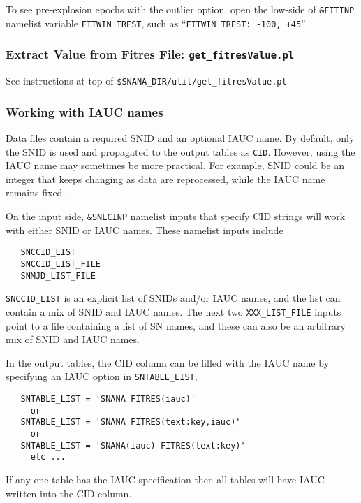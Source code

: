 \documentclass[12pt]{article}
\newcommand{\snanadir}{{\tt SNANA\_DIR}}
\begin{document}
{To see pre-explosion epochs with the outlier option, 
open the low-side of  {\tt \&FITINP} namelist variable
{\tt FITWIN\_TREST}, such as ``{\tt FITWIN\_TREST: -100, +45}''

  \subsubsection{Extract Value from Fitres File: {\tt get\_fitresValue.pl}}
  \label{sss:getValue}

See instructions at top of 
{\tt \$\snanadir/util/get\_fitresValue.pl}


  \subsubsection{Working with IAUC names}
  \label{sss:IAUC}

Data files contain a required SNID and an optional IAUC name.
By default, only the SNID is used and propagated to the output
tables as {\tt CID}. However, using the IAUC name may sometimes
be more practical. For example, SNID could be an integer that keeps
changing as data are reprocessed, while the IAUC name remains fixed.

On the input side, {\tt\&SNLCINP} namelist inputs that specify
CID strings will work with either SNID or IAUC names.
These namelist inputs include
%
\begin{verbatim}
   SNCCID_LIST   
   SNCCID_LIST_FILE
   SNMJD_LIST_FILE
\end{verbatim}
{\tt SNCCID\_LIST} is an explicit list of SNIDs and/or IAUC names,
and the list can contain a mix of SNID and IAUC names.
The next two {\tt XXX\_LIST\_FILE} inputs point to a file
containing a list of SN names, and these can also be an arbitrary 
mix of SNID and IAUC names.

In the output tables, the CID column can be filled with the
IAUC name by specifying an IAUC option in {\tt SNTABLE\_LIST},
%
\begin{verbatim}
   SNTABLE_LIST = 'SNANA FITRES(iauc)'
     or
   SNTABLE_LIST = 'SNANA FITRES(text:key,iauc)'
     or 
   SNTABLE_LIST = 'SNANA(iauc) FITRES(text:key)'
     etc ...
\end{verbatim}
%
If any one table has the IAUC specification then
all tables will have IAUC written into the CID column.

}
\end{document}
